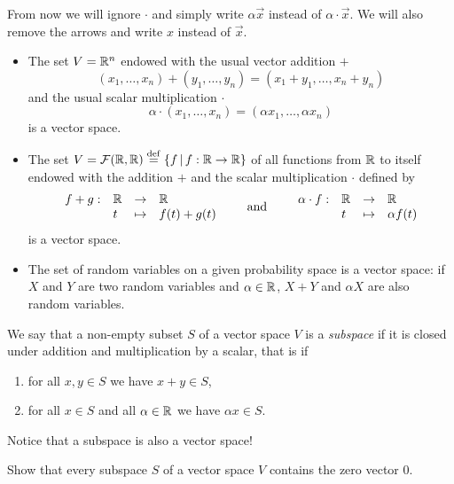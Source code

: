 \documentclass[11pt,nocut]{article}
\begin{document}
From now we will ignore $\cdot$ and simply write $\alpha \vec{x}$ instead of $\alpha \cdot \vec{x}$. We will also remove the arrows and write $x$ instead of $\vec{x}$.

\begin{example}
	\leavevmode
	\begin{itemize}
		\item The set $V = \mathbb{R}^n$ endowed with the usual vector addition $+$
			$$
			(x_1, \dots, x_n) + (y_1, \dots, y_n) = (x_1 + y_1, \dots, x_n + y_n)
			$$
			and the usual scalar multiplication $\cdot$
			$$
			\alpha \cdot (x_1, \dots, x_n)= (\alpha x_1, \dots, \alpha x_n)
			$$
			is a vector space.
		\item The set $V = \mathcal{F}(\mathbb{R},\mathbb{R}) \overset{\rm def}{=} \{ f \, | \, f: \mathbb{R} \to \mathbb{R} \}$ of all functions from $\mathbb{R}$ to itself endowed with the addition $+$ and the scalar multiplication $\cdot$ defined by
			$$
			\begin{array}{rlll}
				f+g :& \mathbb{R} & \to & \mathbb{R} \\
					 &t & \mapsto & f(t) + g(t)
			\end{array}
			\qquad
			\text{and}
			\qquad
			\begin{array}{rlll}
				\alpha \cdot f :& \mathbb{R} & \to & \mathbb{R} \\
								&t & \mapsto & \alpha f(t)
			\end{array}
			$$
			is a vector space.
		\item The set of random variables on a given probability space is a vector space: if $X$ and $Y$ are two random variables and $\alpha \in \mathbb{R}$, $X+Y$ and $\alpha X$ are also random variables.
	\end{itemize}
\end{example}

\begin{definition}[Subspace]
	We say that a non-empty subset $S$ of a vector space $V$ is a \emph{subspace} if it is closed under addition and multiplication by a scalar, that is if
	\begin{enumerate}[label=(\roman*),noitemsep]
		\item for all $x,y \in S$ we have $x + y \in S$,
		\item for all $x \in S$ and all $\alpha \in \mathbb{R}$ we have $\alpha x \in S$.
	\end{enumerate}
\end{definition}

Notice that a subspace is also a vector space!
\begin{exercise}
	Show that every subspace $S$ of a vector space $V$ contains the zero vector $0$.
\end{exercise}
\end{document}

